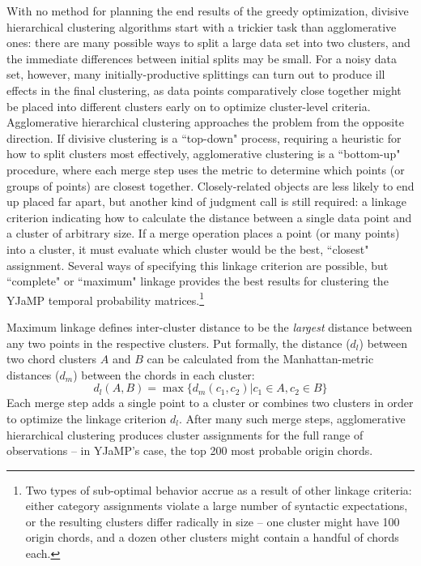 With no method for planning the end results of the greedy optimization, divisive hierarchical clustering algorithms start with a trickier task than agglomerative ones: there are many possible ways to split a large data set into two clusters, and the immediate differences between initial splits may be small.  For a noisy data set, however, many initially-productive splittings can turn out to produce ill effects in the final clustering, as data points comparatively close together might be placed into different clusters early on to optimize cluster-level criteria.  Agglomerative hierarchical clustering approaches the problem from the opposite direction.  If divisive clustering is a ``top-down" process, requiring a heuristic for how to split clusters most effectively, agglomerative clustering is a ``bottom-up" procedure, where each merge step uses the metric to determine which points (or groups of points) are closest together.  Closely-related objects are less likely to end up placed far apart, but another kind of judgment call is still required: a linkage criterion indicating how to calculate the distance between a single data point and a cluster of arbitrary size.  If a merge operation places a point (or many points) into a cluster, it must evaluate which cluster would be the best, ``closest" assignment.  Several ways of specifying this linkage criterion are possible, but ``complete" or ``maximum" linkage provides the best results for clustering the YJaMP temporal probability matrices.\footnote{Two types of sub-optimal behavior accrue as a result of other linkage criteria: either category assignments violate a large number of syntactic expectations, or the resulting clusters differ radically in size -- one cluster might have 100 origin chords, and a dozen other clusters might contain a handful of chords each.}

Maximum linkage defines inter-cluster distance to be the \emph{largest} distance between any two points in the respective clusters.  Put formally, the distance ($d_l$) between two chord clusters $A$ and $B$ can be calculated from the Manhattan-metric distances ($d_m$) between the chords in each cluster:
\begin{equation}
\label{eq:d_l}
d_l(A,B) = \max \{ d_m(c_1,c_2) \vert c_1 \in A, c_2 \in B \}
\end{equation}
Each merge step adds a single point to a cluster or combines two clusters in order to optimize the linkage criterion $d_l$.  After many such merge steps, agglomerative hierarchical clustering produces cluster assignments for the full range of observations -- in YJaMP's case, the top 200 most probable origin chords.

